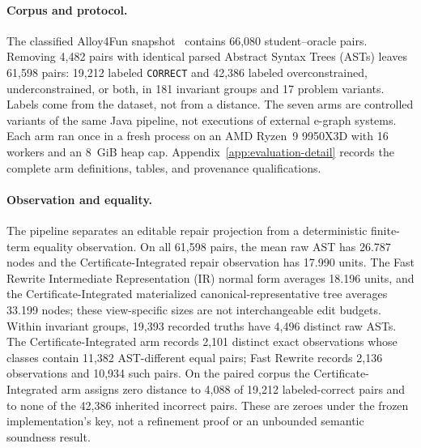 \paragraph{Corpus and protocol.}
The classified Alloy4Fun snapshot~\cite{alloy4funDataset2023,alloy4fun,novice} contains 66,080
student--oracle pairs.  Removing 4,482 pairs with identical parsed Abstract Syntax Trees (ASTs) leaves
61,598 pairs: 19,212 labeled \texttt{CORRECT} and 42,386 labeled
overconstrained, underconstrained, or both, in 181 invariant groups and 17
problem variants.  Labels come from the dataset, not from a distance.  The
seven arms are controlled variants of the same Java pipeline, not executions
of external e-graph systems.  Each arm ran once in a fresh process on an AMD
Ryzen~9 9950X3D with 16 workers and an 8~GiB heap cap.  Appendix~\ref{app:evaluation-detail}
records the complete arm definitions, tables, and provenance qualifications.

\paragraph{Observation and equality.}
The pipeline separates an editable repair projection from a deterministic
finite-term equality observation.  On all 61,598 pairs, the mean raw AST has
26.787 nodes and the Certificate-Integrated repair observation has 17.990
units.  The Fast Rewrite Intermediate Representation (IR) normal form averages 18.196 units, and the
Certificate-Integrated materialized canonical-representative tree averages
33.199 nodes; these view-specific sizes are not interchangeable edit budgets.
Within invariant groups, 19,393 recorded truths have 4,496 distinct raw ASTs.
The Certificate-Integrated arm records 2,101 distinct exact observations whose
classes contain 11,382 AST-different equal pairs; Fast Rewrite records 2,136
observations and 10,934 such pairs.  On the paired corpus the
Certificate-Integrated arm assigns zero distance to 4,088 of 19,212
labeled-correct pairs and to none of the 42,386 inherited incorrect pairs.
These are zeroes under the frozen implementation's key, not a refinement proof
or an unbounded semantic soundness result.

